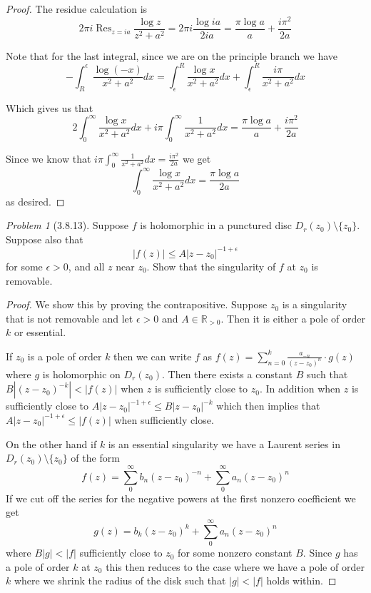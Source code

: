 \documentclass[10pt]{article}
\newcommand{\sk}{\vskip 10mm}
\newcommand{\bb}[1]{\mathbb{#1}}
\DeclareMathOperator{\Res}{Res}
\theoremstyle{remark}
\newtheorem{problem}{Problem}
\theoremstyle{remark}
\begin{document}
\begin{proof}
  The residue calculation is
  \[
    2\pi i\Res_{z=ia}\frac{\log z}{z^2+a^2}= 2\pi i\frac{\log ia}{2ia} = \frac{\pi\log a}{a}+\frac{i\pi^2}{2a}
  \]

  Note that for the last integral, since we are on the principle branch we have
  \[
    -\int_{R}^{\epsilon}\frac{\log \left(-x\right)}{x^2+a^2}dx =\int_\epsilon^R\frac{\log x}{x^2+a^2}dx+\int_\epsilon^R\frac{i\pi}{x^2+a^2}dx
  \]
  
  Which gives us that
  \[
    2\int_0^\infty\frac{\log x}{x^2+a^2}dx+i\pi\int_0^\infty\frac{1}{x^2+a^2}dx = \frac{\pi\log a}{a}+\frac{i\pi^2}{2a}
  \]

  Since we know that $i\pi\int_0^\infty\frac{1}{x^2+a^2}dx = \frac{i\pi^2}{2a}$ we get
  \[
    \int_0^\infty\frac{\log x}{x^2+a^2}dx=\frac{\pi\log a}{2a}
  \]
  as desired.
\end{proof}

\sk

\begin{problem}[3.8.13]
  Suppose $f$ is holomorphic in a punctured disc $D_r\left(z_0\right)\setminus\{z_0\}$.
  Suppose also that
  \[
    \left|f\left(z\right)\right|\leq A\left|z-z_0\right|^{-1+\epsilon}
  \]
  for some $\epsilon>0$, and all $z$ near $z_0$. Show that the singularity
  of $f$ at $z_0$ is removable.
\end{problem}

\begin{proof}
  We show this by proving the contrapositive. Suppose $z_0$ is a singularity
  that is not removable and let $\epsilon>0$ and $A\in\bb{R}_{>0}$.
  Then it is either a pole of order $k$ or essential.

  If $z_0$ is a pole of order $k$ then we can write $f$ as
  $f\left(z\right)=\sum_{n=0}^k\frac{a_{-n}}{\left(z-z_0\right)^{n}}\cdot g\left(z\right)$ where $g$ is holomorphic on
  $D_r\left(z_0\right)$. Then there exists a constant $B$ such that $B|\left(z-z_0\right)^{-k}|<|f\left(z\right)|$
  when $z$ is sufficiently close to $z_0$. In addition when $z$ is sufficiently
  close to $A|z-z_0|^{-1+\epsilon}\leq B|z-z_0|^{-k}$ which then implies that
  $A|z-z_0|^{-1+\epsilon}\leq|f\left(z\right)|$ when sufficiently close.

  On the other hand if $k$ is an essential singularity we have a Laurent
  series in $D_r\left(z_0\right)\setminus\{z_0\}$ of the form
  \[
    f\left(z\right)=\sum_0^\infty b_n\left(z-z_0\right)^{-n} +\sum_0^\infty a_n\left(z-z_0\right)^n
  \]
  If we cut off the series for the negative powers at the first nonzero coefficient
  we get
  \[
    g\left(z\right)=b_k\left(z-z_0\right)^k+\sum_0^\infty a_n\left(z-z_0\right)^n
  \]
  where $B|g|<|f|$ sufficiently close to $z_0$ for some nonzero constant $B$. Since
  $g$ has a pole of order $k$ at $z_0$ this then reduces to the case where we have a
  pole of order $k$ where we shrink the radius of the disk such that $|g|<|f|$ holds within.
\end{proof}
\end{document}
